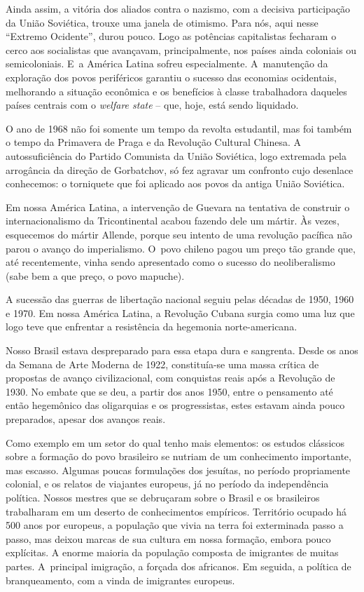 Ainda assim, a vitória dos aliados contra o nazismo, com a decisiva
participação da União Soviética, trouxe uma janela de otimismo. Para nós,
aqui nesse “Extremo Ocidente”, durou pouco. Logo as potências
capitalistas fecharam o cerco aos socialistas que avançavam,
principalmente, nos países ainda coloniais ou semicoloniais. E~a América
Latina sofreu especialmente. A~manutenção da exploração dos povos
periféricos garantiu o sucesso das economias ocidentais, melhorando a
situação econômica e os benefícios à classe trabalhadora daqueles países
centrais com o {\it welfare state} -- que, hoje, está sendo liquidado.

O ano de 1968 não foi somente um tempo da revolta estudantil, mas foi também o tempo
da Primavera de Praga e da Revolução Cultural Chinesa. A
autossuficiência do Partido Comunista da União Soviética, logo extremada
pela arrogância da direção de Gorbatchov, só fez agravar um confronto
cujo desenlace conhecemos: o torniquete que foi aplicado aos povos da
antiga União Soviética.

Em nossa América Latina, a intervenção de Guevara na tentativa de construir o
internacionalismo da Tricontinental acabou fazendo dele um mártir. Às
vezes, esquecemos do mártir Allende, porque seu intento de uma revolução
pacífica não parou o avanço do imperialismo. O~povo chileno pagou um
preço tão grande que, até recentemente, vinha sendo apresentado como o
sucesso do neoliberalismo (sabe bem a que preço, o povo mapuche).

A sucessão das guerras de libertação nacional seguiu pelas décadas de
1950, 1960 e 1970. Em nossa América Latina, a Revolução Cubana surgia como
uma luz que logo teve que enfrentar a resistência da hegemonia norte-americana.

Nosso Brasil estava despreparado para essa etapa dura e sangrenta. Desde
os anos da Semana de Arte Moderna de 1922, constituía-se uma massa crítica
de propostas de avanço civilizacional, com conquistas reais após a
Revolução de 1930. No embate que se deu, a partir dos anos 1950, entre o
pensamento até então hegemônico das oligarquias e os progressistas, estes
estavam ainda pouco preparados, apesar dos avanços reais.

Como exemplo em um setor do qual tenho mais elementos: os estudos
clássicos sobre a formação do povo brasileiro se nutriam de um
conhecimento importante, mas escasso. Algumas poucas formulações dos
jesuítas, no período propriamente colonial, e os relatos de viajantes europeus,
já no período da independência política. Nossos mestres que
se debruçaram sobre o Brasil e os brasileiros trabalharam em um deserto
de conhecimentos empíricos. Território ocupado há 500 anos por europeus,
a população que vivia na terra foi exterminada passo a passo, mas deixou
marcas de sua cultura em nossa formação, embora pouco explícitas. A
enorme maioria da população composta de imigrantes de muitas partes. A~principal
imigração, a forçada dos africanos. Em seguida, a política de branqueamento,
com a vinda de imigrantes europeus.

